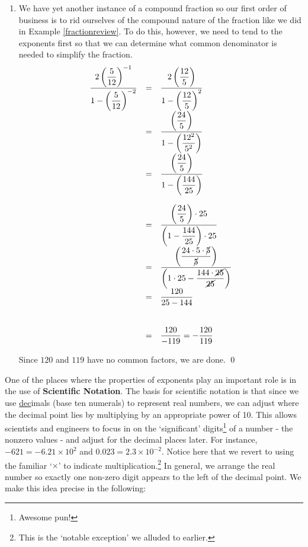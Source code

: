 \begin{ex}
\begin{enumerate}
\item We have yet another instance of a compound fraction so our first order of business is to rid ourselves of the compound nature of the fraction like we did in Example \ref{fractionreview}.  To do this, however, we need to tend to the exponents first so that we can determine what common denominator is needed to simplify the fraction.\[ \begin{array}{rclcl} \dfrac{2 \left(\dfrac{5}{12}\right)^{-1}}{1 - \left(\dfrac{5}{12}\right)^{-2}} & = & \dfrac{2 \left(\dfrac{12}{5}\right)}{1 - \left(\dfrac{12}{5}\right)^{2}} \\ & = & \dfrac{\left(\dfrac{24}{5}\right)}{1 - \left(\dfrac{12^2}{5^2}\right)} \\ & = & \dfrac{\left(\dfrac{24}{5}\right)}{1 - \left(\dfrac{144}{25}\right)} \\ [30pt]

& = & \dfrac{\left(\dfrac{24}{5}\right) \cdot 25}{\left(1 - \dfrac{144}{25}\right)\cdot 25} \\ & = & \dfrac{\left(\dfrac{24\cdot 5 \cdot \cancel{5}}{\cancel{5}}\right)}{\left(1 \cdot 25 - \dfrac{144 \cdot \cancel{25}}{\cancel{25}}\right)} \\ & = & \dfrac{120}{25-144} \\ [30pt]
& = & \dfrac{120}{-119} = -\dfrac{120}{119} \\  \end{array} \]

Since $120$ and $119$ have no common factors, we are done.  \qed

\end{enumerate}

\end{ex}

\medskip

One of the places where the properties of exponents play an important role is in the use of \textbf{Scientific Notation}.  The basis for scientific notation is that since we use \underline{dec}imals (base ten numerals) to represent real numbers, we can adjust where the decimal point lies by multiplying by an appropriate power of 10.  This allows scientists and engineers to focus in on the `significant' digits\footnote{Awesome pun!} of a number - the nonzero values - and adjust for the decimal places later.  For instance, $-621 = -6.21 \times 10^2$ and $0.023 = 2.3 \times 10^{-2}$.  Notice here that we revert to using the familiar `$\times$' to indicate multiplication.\footnote{This is the `notable exception' we alluded to earlier.}   In general, we arrange the real number so exactly one non-zero digit appears to the left of the decimal point.  We make this idea precise in the following: 

